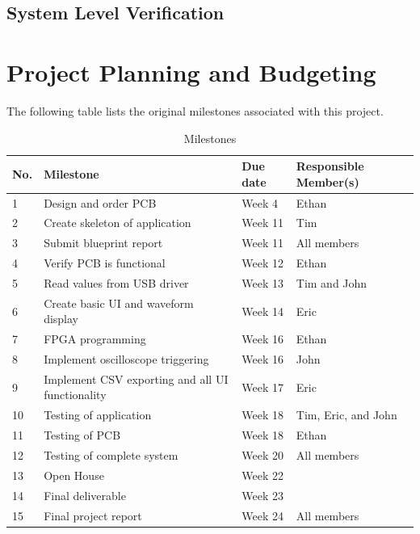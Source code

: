\documentclass[letterpaper,11pt]{article}
\begin{document}
\subsection{System Level Verification} %

\section{Project Planning and Budgeting} %

The following table lists the original milestones associated with this project.
\begin{table}[H]
    \caption{Milestones}
    \begin{tabularx}{\textwidth}{l|l|l|l}
        No. & Milestone & Due date & Responsible Member(s) \\
        \hline
        1 & Design and order PCB & Week 4 & Ethan \\
        2 & Create skeleton of application & Week 11 & Tim \\
        3 & Submit blueprint report & Week 11 & All members \\
        4 & Verify PCB is functional & Week 12 & Ethan \\
        5 & Read values from USB driver & Week 13 & Tim and John \\
        6 & Create basic UI and waveform display & Week 14 & Eric \\
        7 & FPGA programming & Week 16 & Ethan \\
        8 & Implement oscilloscope triggering & Week 16 & John \\
        9 & Implement CSV exporting and all UI functionality & Week 17 & Eric \\
        10 & Testing of application & Week 18 & Tim, Eric, and John \\
        11 & Testing of PCB & Week 18 & Ethan \\
        12 & Testing of complete system & Week 20 & All members \\
        13 & Open House & Week 22 & \\
        14 & Final deliverable & Week 23 & \\
        15 & Final project report & Week 24 & All members
    \end{tabularx} 
\label{hw:milestones-table}
\end{table}
\end{document}
